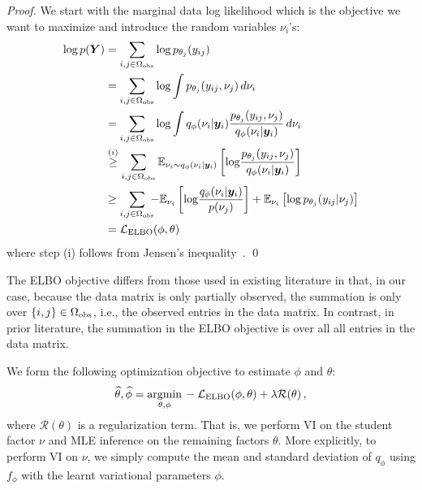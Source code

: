 \documentclass{edm_article}
\begin{document}
\begin{proof} 
We start with the marginal data log likelihood which is the objective we want to maximize and introduce the random variables $\nu_i$'s: 
\begin{align} 
    {\rm log}\,p({\bm{Y}}) &= \sum_{i,j\in\Omega_{\rm obs}} {\rm log}\, p_{\theta_j}(y_{ij}) \nonumber \\ 
    &= \sum_{i,j\in\Omega_{\rm obs}} {\rm log}\int p_{\theta_j}(y_{ij}, \nu_j) \,d\nu_i \nonumber \\
    &= \sum_{i,j\in\Omega_{\rm obs}} {\rm log}\int q_\phi(\nu_i|{\bm{y}}_i) \frac{p_{\theta_j}(y_{ij}, \nu_j)}{q_\phi(\nu_i|{\bm{y}}_i)}\,d\nu_i \nonumber \\
    &\overset{(i)}{\geq} \sum_{i,j\in\Omega_{\rm obs}}\mathbb{E}_{\nu_i\sim q_\phi(\nu_i|{\bm{y}}_i)}\left[ {\rm log}\frac{p_{\theta_j}(y_{ij}, \nu_j)}{q_\phi(\nu_i|{\bm{y}}_i)}\right] \nonumber\\
    &\geq \sum_{i,j\in\Omega_{\rm obs}} \hspace{-5pt}- \mathbb{E}_{\nu_i}\left[{\rm log} \frac{q_\phi(\nu_i|{\bm{y}}_i)}{p(\nu_j)}\right] + \mathbb{E}_{\nu_i}\left[ {\rm log}\,p_{\theta_j}(y_{ij}|\nu_j)\right] \nonumber\\
    &= \mathcal{L}_{\rm ELBO}(\phi,\theta)  \nonumber
\end{align}
where step (i) follows from Jensen's inequality~\cite{jensen1906fonctions}. \qed
\end{proof}

The ELBO objective differs from those used in existing literature in that, in our case, because the data matrix is only partially observed, the summation is only over $\{i,j\}\in\Omega_{\rm obs}$, i.e., the observed entries in the data matrix. In contrast, in prior literature, the summation in the ELBO objective is over all all entries in the data matrix.

We form the following optimization objective to estimate $\phi$ and $\theta$:
\begin{align}
    \widehat{\theta}, \widehat{\phi} = \underset{\theta, \phi}{\rm argmin}\, -\mathcal{L}_{\rm ELBO}(\phi, \theta) + \lambda \mathcal{R}(\theta)\,,\label{eq:objective}
\end{align}
where $\mathcal{R}(\theta)$ is a regularization term.
That is, we perform VI on the student factor $\nu$ and MLE inference on the remaining factors $\theta$. More explicitly, to perform VI on $\nu$, we simply compute the mean and standard deviation of $q_\phi$ using $f_\phi$ with the learnt variational parameters $\phi$. 
\end{document}

